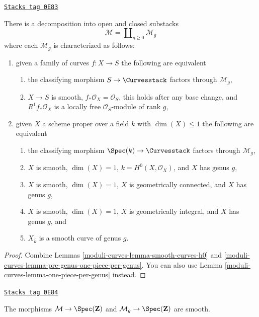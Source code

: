 \begin{lemma}
\label{moduli-curves-lemma-smooth-one-piece-per-genus}
\href{https://stacks.math.columbia.edu/tag/0E83}{\texttt{Stacks tag 0E83}}

There is a decomposition into open and closed substacks
$$
\mathcal{M} = \coprod\nolimits_{g \geq 0} \mathcal{M}_g
$$
where each $\mathcal{M}_g$ is characterized as follows:
\begin{enumerate}
\item given a family of curves $f : X \to S$ the following are equivalent
\begin{enumerate}
\item the classifying morphism $S \to \Curvesstack$ factors
through $\mathcal{M}_g$,
\item $X \to S$ is smooth, $f_*\mathcal{O}_X = \mathcal{O}_S$,
this holds after any base change, and $R^1f_*\mathcal{O}_X$
is a locally free $\mathcal{O}_S$-module of rank $g$,
\end{enumerate}
\item given $X$ a scheme proper over a field $k$ with
$\dim(X) \leq 1$ the following are equivalent
\begin{enumerate}
\item the classifying morphism $\Spec(k) \to \Curvesstack$
factors through $\mathcal{M}_g$,
\item $X$ is smooth, $\dim(X) = 1$, $k = H^0(X, \mathcal{O}_X)$,
and $X$ has genus $g$,
\item $X$ is smooth, $\dim(X) = 1$, $X$ is geometrically connected, and
$X$ has genus $g$,
\item $X$ is smooth, $\dim(X) = 1$, $X$ is geometrically integral, and
$X$ has genus $g$, and
\item $X_{\overline{k}}$ is a smooth curve of genus $g$.
\end{enumerate}
\end{enumerate}
\end{lemma}

\begin{proof}
Combine Lemmas \ref{moduli-curves-lemma-smooth-curves-h0} and
\ref{moduli-curves-lemma-pre-genus-one-piece-per-genus}.
You can also use
Lemma \ref{moduli-curves-lemma-one-piece-per-genus}
instead.
\end{proof}

\begin{lemma}
\label{moduli-curves-lemma-smooth-curves-h0-smooth}
\href{https://stacks.math.columbia.edu/tag/0E84}{\texttt{Stacks tag 0E84}}

The morphisms $\mathcal{M} \to \Spec(\mathbf{Z})$ and
$\mathcal{M}_g \to \Spec(\mathbf{Z})$
are smooth.
\end{lemma}

